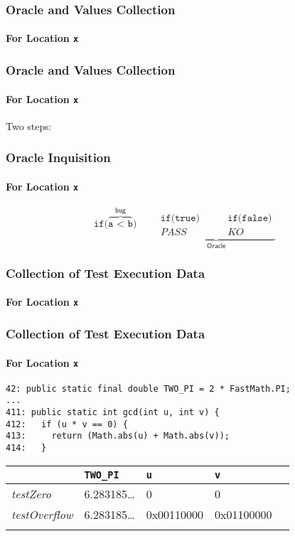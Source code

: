 \frame
{
  \frametitle{Oracle and Values Collection}
  \framesubtitle{For Location \texttt{x}}
  \begin{center}
  
  \end{center}
}

\frame
{
  \frametitle{Oracle and Values Collection}
  \framesubtitle{For Location \texttt{x}}
  Two steps:
  \begin{center}
  
  \end{center}
}

\begin{frame}
  \frametitle{Oracle Inquisition}
  \framesubtitle{For Location \texttt{x}}
 \begin{equation*}
  \texttt{if(}\overbrace{\texttt{a < b}}^{\displaystyle \textsf{bug}}\texttt{)} \qquad \underbrace{\begin{array}{cc}
                                         \texttt{if(true)} \quad & \quad \texttt{if(false)} \\
                                         PASS \quad & \quad KO
                                        \end{array} }_{\displaystyle \textsf{Oracle}}
 \end{equation*}
\end{frame}

\frame
{
  \frametitle{Collection of Test Execution Data}
  \framesubtitle{For Location \texttt{x}}
  \begin{center}
  
  \end{center}
}


\begin{frame}[fragile]
  \frametitle{Collection of Test Execution Data}
  \framesubtitle{For Location \texttt{x}}
\begin{lstlisting}[basicstyle=\footnotesize]
 42: public static final double TWO_PI = 2 * FastMath.PI;
...
411: public static int gcd(int u, int v) {
412:   if (u * v == 0) {
413:     return (Math.abs(u) + Math.abs(v));
414:   }
\end{lstlisting}

\begin{center}
\begin{tabular}{|l|l|l|l|l}
\hline
 & \texttt{TWO\_PI} & \texttt{u} & \texttt{v} & \\
\hline
\textit{testZero} & 6.283185\dots & 0 & 0 & \\
\hline
\textit{testOverflow} & 6.283185\dots & 0x00110000 & 0x01100000 & \\
\hline
 & & & & \\
\end{tabular}
\end{center}
\end{frame}
